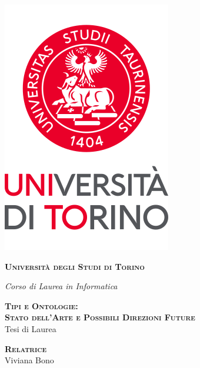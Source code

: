 \begin{titlepage}
    \begin{center}
        \includegraphics[scale=.4]{head/logo.png}
    \end{center}
    \begin{center}
        \vspace{10mm}
        {\Large
        	{\textsc
        		{\bfseries Universit\`a degli Studi di Torino\\} 
        		\vspace{2mm}
        		
        	}
       	}
       	{\large{\textsl{Corso di Laurea in Informatica}}}
        \vspace{5mm}
    \end{center}
    \begin{center}
        \vspace{5mm}
        {\Large
        	{\textsc{\bfseries Tipi e Ontologie:\\ Stato dell'Arte e Possibili Direzioni Future\\}}
        	\vspace{3mm}
        	Tesi di Laurea\\
        }
    \end{center}
    \vspace{5mm}
    \par
    \noindent
    \begin{minipage}[t]{0.47\textwidth}
        {\large{\bf \textsc{Relatrice}}\\
            Viviana Bono}\\
            

\end{minipage}
\end{titlepage}

